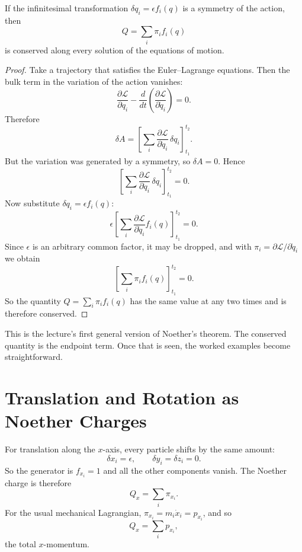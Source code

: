 \begin{theorem}
If the infinitesimal transformation \(\delta q_i=\epsilon f_i(q)\) is a symmetry of the action, then
\begin{equation}
Q=\sum_i \pi_i f_i(q)
\end{equation}
is conserved along every solution of the equations of motion.
\end{theorem}

\begin{proof}
Take a trajectory that satisfies the Euler--Lagrange equations. Then the bulk term in the variation of the action vanishes:
\begin{equation}
\frac{\partial \mathcal{L}}{\partial q_i}
-
\frac{d}{dt}
\left(
\frac{\partial \mathcal{L}}{\partial \dot q_i}
\right)
=0.
\end{equation}
Therefore
\begin{equation}
\delta A
=
\left[
\sum_i
\frac{\partial \mathcal{L}}{\partial \dot q_i}\,\delta q_i
\right]_{t_1}^{t_2}.
\end{equation}
But the variation was generated by a symmetry, so \(\delta A=0\). Hence
\begin{equation}
\left[
\sum_i
\frac{\partial \mathcal{L}}{\partial \dot q_i}\,\delta q_i
\right]_{t_1}^{t_2}
=0.
\end{equation}
Now substitute \(\delta q_i=\epsilon f_i(q)\):
\begin{equation}
\epsilon
\left[
\sum_i
\frac{\partial \mathcal{L}}{\partial \dot q_i}f_i(q)
\right]_{t_1}^{t_2}
=0.
\end{equation}
Since \(\epsilon\) is an arbitrary common factor, it may be dropped, and with \(\pi_i=\partial \mathcal{L}/\partial \dot q_i\) we obtain
\begin{equation}
\left[
\sum_i \pi_i f_i(q)
\right]_{t_1}^{t_2}
=0.
\end{equation}
So the quantity \(Q=\sum_i \pi_i f_i(q)\) has the same value at any two times and is therefore conserved.
\end{proof}

This is the lecture's first general version of Noether's theorem. The conserved quantity is the endpoint term. Once that is seen, the worked examples become straightforward.

\section{Translation and Rotation as Noether Charges}

For translation along the \(x\)-axis, every particle shifts by the same amount:
\begin{equation}
\delta x_i=\epsilon,
\qquad
\delta y_i=\delta z_i=0.
\end{equation}
So the generator is \(f_{x_i}=1\) and all the other components vanish. The Noether charge is therefore
\begin{equation}
Q_x=\sum_i \pi_{x_i}.
\end{equation}
For the usual mechanical Lagrangian, \(\pi_{x_i}=m_i\dot x_i=p_{x_i}\), and so
\begin{equation}
Q_x=\sum_i p_{x_i},
\end{equation}
the total \(x\)-momentum.

